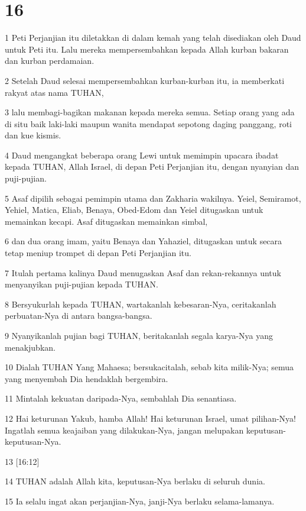 \chapter{16}

\par 1 Peti Perjanjian itu diletakkan di dalam kemah yang telah disediakan oleh Daud untuk Peti itu. Lalu mereka mempersembahkan kepada Allah kurban bakaran dan kurban perdamaian.
\par 2 Setelah Daud selesai mempersembahkan kurban-kurban itu, ia memberkati rakyat atas nama TUHAN,
\par 3 lalu membagi-bagikan makanan kepada mereka semua. Setiap orang yang ada di situ baik laki-laki maupun wanita mendapat sepotong daging panggang, roti dan kue kismis.
\par 4 Daud mengangkat beberapa orang Lewi untuk memimpin upacara ibadat kepada TUHAN, Allah Israel, di depan Peti Perjanjian itu, dengan nyanyian dan puji-pujian.
\par 5 Asaf dipilih sebagai pemimpin utama dan Zakharia wakilnya. Yeiel, Semiramot, Yehiel, Matica, Eliab, Benaya, Obed-Edom dan Yeiel ditugaskan untuk memainkan kecapi. Asaf ditugaskan memainkan simbal,
\par 6 dan dua orang imam, yaitu Benaya dan Yahaziel, ditugaskan untuk secara tetap meniup trompet di depan Peti Perjanjian itu.
\par 7 Itulah pertama kalinya Daud menugaskan Asaf dan rekan-rekannya untuk menyanyikan puji-pujian kepada TUHAN.
\par 8 Bersyukurlah kepada TUHAN, wartakanlah kebesaran-Nya, ceritakanlah perbuatan-Nya di antara bangsa-bangsa.
\par 9 Nyanyikanlah pujian bagi TUHAN, beritakanlah segala karya-Nya yang menakjubkan.
\par 10 Dialah TUHAN Yang Mahaesa; bersukacitalah, sebab kita milik-Nya; semua yang menyembah Dia hendaklah bergembira.
\par 11 Mintalah kekuatan daripada-Nya, sembahlah Dia senantiasa.
\par 12 Hai keturunan Yakub, hamba Allah! Hai keturunan Israel, umat pilihan-Nya! Ingatlah semua keajaiban yang dilakukan-Nya, jangan melupakan keputusan-keputusan-Nya.
\par 13 [16:12]
\par 14 TUHAN adalah Allah kita, keputusan-Nya berlaku di seluruh dunia.
\par 15 Ia selalu ingat akan perjanjian-Nya, janji-Nya berlaku selama-lamanya.
